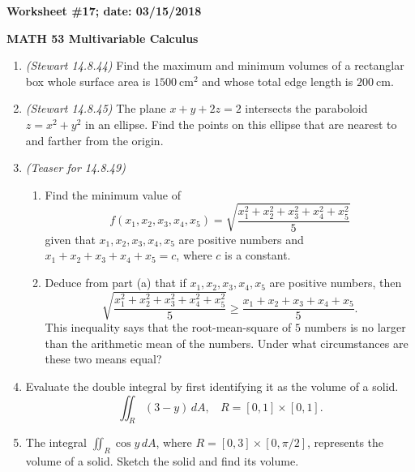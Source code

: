 \documentclass{article}
\begin{document}
{\bf Worksheet \#17; date: 03/15/2018}

{\bf MATH 53 Multivariable Calculus}

\begin{enumerate}
\item {\em (Stewart 14.8.44)} Find the maximum and minimum volumes of a rectanglar box whole surface area is $1500~\text{cm}^2$ and whose total edge length is $200~\text{cm}$.

\item {\em (Stewart 14.8.45)} The plane $x + y + 2z = 2$ intersects the paraboloid $z = x^2 + y^2$ in an ellipse. Find the points on this ellipse that are nearest to and farther from the origin.

\item {\em (Teaser for 14.8.49)}
\begin{enumerate}
\item Find the minimum value of
\[
f(x_1, x_2, x_3, x_4, x_5) = \sqrt{\frac{x_1^2 + x_2^2 + x_3^2 + x_4^2 + x_5^2}{5}}
\]
given that $x_1, x_2, x_3, x_4, x_5$ are positive numbers and $x_1 + x_2 + x_3 + x_4 + x_5 = c$, where $c$ is a constant.

\item Deduce from part (a) that if $x_1, x_2, x_3, x_4, x_5$ are positive numbers, then
\[
\sqrt{\frac{x_1^2 + x_2^2 + x_3^2 + x_4^2 + x_5^2}{5}} \ge \frac{x_1 + x_2 + x_3 + x_4 + x_5}{5}.
\]
This inequality says that the root-mean-square of $5$ numbers is no larger than the arithmetic mean of the numbers. Under what circumstances are these two means equal?
\end{enumerate}

\item Evaluate the double integral by first identifying it as the volume of a solid.
\[
\iint_R (3 - y) \,dA, ~~~~ R = [0, 1] \times [0, 1].
\]

\item The integral $\iint_R \cos y \,dA$, where $R = [0, 3] \times [0, \pi/2]$, represents the volume of a solid. Sketch the solid and find its volume.

\end{enumerate}
\end{document}
